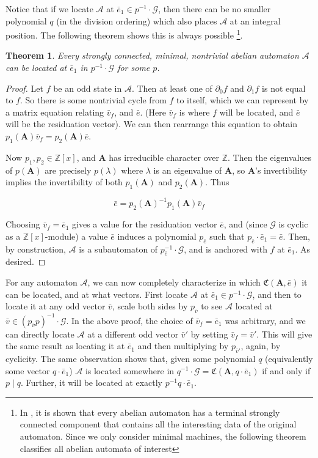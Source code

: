 \documentclass[final]{ws-ijac}
\newcommand{\A}{\mathcal{A}}
\newcommand{\G}{\mathcal{G}}
\newcommand{\C}{\mathfrak{C}(\Am,\e)}
\newcommand{\Z}{\mathbb{Z}}
\newcommand{\2}{\textbf{2}}
\newcommand{\Am}{\textbf{A}}
\newcommand{\del}{\partial}
\newcommand{\vv}{\bar{v}}
\newcommand{\e}{\bar{e}}
\newtheorem{thm}{Theorem}
\begin{document}
Notice that if we locate $\A$ at $\e_1 \in p^{-1} \cdot \G$, 
then there can be no smaller polynomial $q$ (in the division ordering)
which also places $\A$ at an integral position. The following theorem 
shows this is always possible%
\footnote{In \cite{Sutner18:abelian_automata}, it is shown that every
abelian automaton has a terminal strongly connected component that contains
all the interesting data of the original automaton. Since we only
consider minimal machines, the following theorem classifies all abelian 
automata of interest}.

\begin{thm}
  Every strongly connected, minimal, nontrivial abelian automaton $\A$ can be 
  located at $\e_1$ in $p^{-1} \cdot \G$ for some $p$.
\end{thm}

\begin{proof}
  Let $f$ be an odd state in $\A$. Then at least one of $\del_0 f$ and 
  $\del_1 f$ is not equal to $f$. So there is some nontrivial cycle
  from $f$ to itself, which we can represent by a matrix equation 
  relating $\vv_f$, and $\e$. (Here $\vv_f$ is where $f$ will be located, 
  and $\e$ will be the residuation vector). 
  We can then rearrange this equation to obtain 
  $p_1(\Am)\vv_f = p_2(\Am)\e$.

  Now $p_1, p_2 \in \Z[x]$, and $\Am$ has irreducible character over $\Z$.
  Then the eigenvalues of $p(\Am)$ are precisely $p(\lambda)$
  where $\lambda$ is an eigenvalue of $\Am$, so $\Am$'s invertibility implies
  the invertibility of both $p_1(\Am)$ and $p_2(\Am)$. Thus

  \[ \e = p_2(\Am)^{-1}p_1(\Am)\vv_f \]

  Choosing $\vv_f = \e_1$ gives a value for the residuation vector $\e$,
  and (since $\G$ is cyclic as a $\Z[x]$-module) a value $\e$ induces a 
  polynomial $p_{\e}$ such that $p_{\e} \cdot \e_1 = \e$. 
  Then, by construction, $\A$ is a subautomaton of $p_{\e}^{-1} \cdot \G$, and is 
  anchored with $f$ at $\e_1$. As desired.
\end{proof}

For any automaton $\A$, we can now completely characterize in
which $\C$ it can be located, and at what vectors.
First locate $\A$ at $\e_1 \in p^{-1} \cdot \G$, and then to locate it at
any odd vector $\vv$, scale both sides by $p_{\vv}$ to see $\A$ located at
$\vv \in (p_{\vv} p)^{-1} \cdot \G$. 
In the above proof, the choice of $\vv_f = \e_1$ was arbitrary, and we can
directly locate $\A$ at a different odd vector $\vv'$ by setting 
$\vv_f = \vv'$. This will give the same result as locating it at $\e_1$ and 
then multiplying by $p_{\vv'}$, again, by cyclicity.
The same observation shows that, given some polynomial $q$ 
(equivalently some vector $q \cdot \e_1$) $\A$ is located somewhere in 
$q^{-1} \cdot \G = \mathfrak{C}(\Am,q \cdot \e_1)$ if and only if $p \mid q$. 
Further, it will be located at exactly $p^{-1}q \cdot \e_1$.
\end{document}
